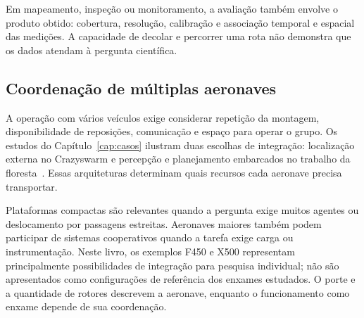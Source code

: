 \documentclass[11pt,a4paper,oneside]{book}
\numberwithin{equation}{chapter}
\begin{document}
Em mapeamento, inspeção ou monitoramento, a avaliação também envolve o produto obtido: cobertura, resolução, calibração e associação temporal e espacial das medições. A capacidade de decolar e percorrer uma rota não demonstra que os dados atendam à pergunta científica.

\subsection{Coordenação de múltiplas aeronaves}
A operação com vários veículos exige considerar repetição da montagem, disponibilidade de reposições, comunicação e espaço para operar o grupo. Os estudos do Capítulo~\ref{cap:casos} ilustram duas escolhas de integração: localização externa no Crazyswarm e percepção e planejamento embarcados no trabalho da floresta~\cite{crazyswarm,wildpaper}. Essas arquiteturas determinam quais recursos cada aeronave precisa transportar.

Plataformas compactas são relevantes quando a pergunta exige muitos agentes ou deslocamento por passagens estreitas. Aeronaves maiores também podem participar de sistemas cooperativos quando a tarefa exige carga ou instrumentação. Neste livro, os exemplos F450 e X500 representam principalmente possibilidades de integração para pesquisa individual; não são apresentados como configurações de referência dos enxames estudados. O porte e a quantidade de rotores descrevem a aeronave, enquanto o funcionamento como enxame depende de sua coordenação.


\appendix
\end{document}
